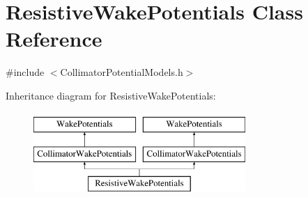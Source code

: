 \hypertarget{classResistiveWakePotentials}{}\section{Resistive\+Wake\+Potentials Class Reference}
\label{classResistiveWakePotentials}


{\ttfamily \#include $<$Collimator\+Potential\+Models.\+h$>$}

Inheritance diagram for Resistive\+Wake\+Potentials\+:\begin{figure}[H]
\begin{center}
\leavevmode
\includegraphics[height=3.000000cm]{classResistiveWakePotentials}
\end{center}
\end{figure}
